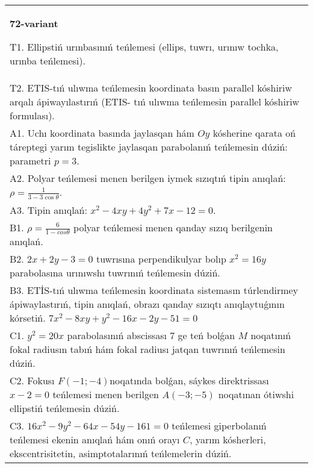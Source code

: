 \documentclass{article}
\begin{document}
\begin{tabular}{m{17cm}}
\textbf{72-variant}
\newline

T1. Ellipstiń urınbasınıń teńlemesi (ellips, tuwrı, urınıw tochka, urınba teńlemesi).\\

T2. ETIS-tıń ulıwma teńlemesin koordinata basın parallel kóshiriw arqalı ápiwayılastırıń (ETIS- tıń ulıwma teńlemesin parallel kóshiriw formulası).\\

A1. Uchı koordinata basında jaylasqan hám $Oy$ kósherine qarata oń táreptegi yarım tegislikte jaylasqan parabolanıń teńlemesin dúziń: parametri $p=3$.\\

A2. Polyar teńlemesi menen berilgen iymek sızıqtıń tipin anıqlań: $\rho=\frac{1}{3-3\cos\theta}$.\\

A3. Tipin anıqlań: $x^{2}-4 xy+4 y^{2}+7 x-12=0$.\\

B1. $\rho = \frac{6}{1 - cos\theta}$ polyar teńlemesi menen qanday sızıq berilgenin anıqlań.  \\

B2. $2x + 2y - 3 = 0$ tuwrısına perpendikulyar bolıp $x^{2} = 16y$ parabolasına urınıwshı tuwrınıń teńlemesin dúziń.  \\

B3. ETİS-tıń ulıwma teńlemesin koordinata sistemasın túrlendirmey ápiwaylastırıń, tipin anıqlań, obrazı qanday sızıqtı anıqlaytuǵının kórsetiń. $7x^{2} - 8xy + y^{2} - 16x - 2y - 51 = 0$  \\

C1. $y^{2} = 20x$ parabolasınıń abscissası 7 ge teń bolǵan $M$ noqatınıń fokal radiusın tabıń hám fokal radiusı jatqan tuwrınıń teńlemesin dúziń.  \\

C2. Fokusı $F( - 1; - 4)$noqatında bolǵan, sáykes direktrissası $x - 2 = 0$ teńlemesi menen berilgen $A( - 3; - 5)$ noqatınan ótiwshi ellipstiń teńlemesin dúziń.  \\

C3. $16x^{2} - 9y^{2} - 64x - 54y - 161 = 0$ teńlemesi giperbolanıń teńlemesi ekenin anıqlań hám onıń orayı $C$, yarım kósherleri, ekscentrisitetin, asimptotalarınıń teńlemelerin dúziń.  \\

\end{tabular}
\vspace{1cm}
\end{document}
